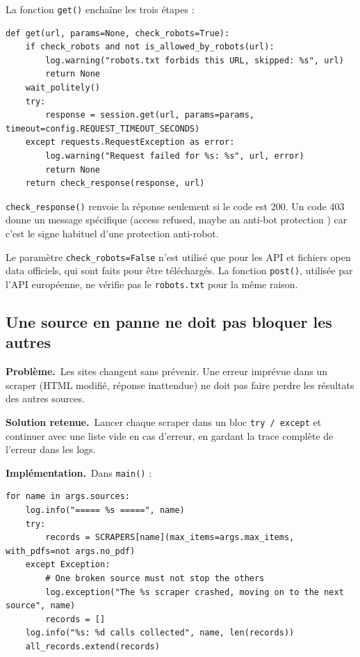 \documentclass[11pt,a4paper]{article}
\newcommand{\pb}{\par\medskip\noindent\textbf{\textcolor{pbcolor}{Problème.}}\ }
\newcommand{\sol}{\par\medskip\noindent\textbf{\textcolor{solcolor}{Solution retenue.}}\ }
\newcommand{\impl}{\par\medskip\noindent\textbf{\textcolor{implcolor}{Implémentation.}}\ }
\newcommand{\code}[1]{\texttt{#1}}
\begin{document}
La fonction \code{get()} enchaîne les trois étapes :

\begin{lstlisting}
def get(url, params=None, check_robots=True):
    if check_robots and not is_allowed_by_robots(url):
        log.warning("robots.txt forbids this URL, skipped: %s", url)
        return None
    wait_politely()
    try:
        response = session.get(url, params=params, timeout=config.REQUEST_TIMEOUT_SECONDS)
    except requests.RequestException as error:
        log.warning("Request failed for %s: %s", url, error)
        return None
    return check_response(response, url)
\end{lstlisting}

\code{check\_response()} renvoie la réponse seulement si le code est 200. Un code 403 donne
un message spécifique (\og access refused, maybe an anti-bot protection \fg) car c'est le
signe habituel d'une protection anti-robot.

Le paramètre \code{check\_robots=False} n'est utilisé que pour les API et fichiers open data
officiels, qui sont faits pour être téléchargés. La fonction \code{post()}, utilisée par
l'API européenne, ne vérifie pas le \code{robots.txt} pour la même raison.

\subsection{Une source en panne ne doit pas bloquer les autres}

\pb Les sites changent sans prévenir. Une erreur imprévue dans un scraper (HTML modifié,
réponse inattendue) ne doit pas faire perdre les résultats des autres sources.

\sol Lancer chaque scraper dans un bloc \code{try / except} et continuer avec une liste
vide en cas d'erreur, en gardant la trace complète de l'erreur dans les logs.

\impl Dans \code{main()} :

\begin{lstlisting}
for name in args.sources:
    log.info("===== %s =====", name)
    try:
        records = SCRAPERS[name](max_items=args.max_items, with_pdfs=not args.no_pdf)
    except Exception:
        # One broken source must not stop the others
        log.exception("The %s scraper crashed, moving on to the next source", name)
        records = []
    log.info("%s: %d calls collected", name, len(records))
    all_records.extend(records)
\end{lstlisting}
\end{document}
